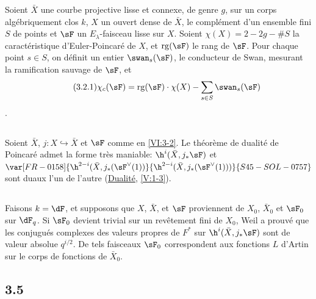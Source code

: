 Soient $\bar X$ une courbe projective lisse et connexe, de genre $g$, sur un 
corps algébriquement clos $k$, $X$ un ouvert dense de $\bar X$, 
le complément d'un ensemble fini $S$ de points et $\sF$ un 
$E_\lambda$-faisceau lisse sur $X$. Soient $\chi(X)=2-2 g-\# S$ la 
caractéristique d'Euler-Poincaré de $X$, et $\operatorname{rg}(\sF)$ le 
rang de $\sF$. Pour chaque point $s\in S$, on définit un entier 
$\swan_s(\sF)$, le conducteur de Swan, mesurant la ramification sauvage de 
$\sF$, et 
\begin{align*}\tag{3.2.1}\label{VI:eq:3-2-1}
  \chi_c(\sF) = \operatorname{rg}(\sF) \cdot \chi(X) - \sum_{s\in S} \swan_s(\sF) 
\end{align*}
. 





\subsection{}\label{VI:3-3}

Soient $\bar X$, $j:X\hookrightarrow\bar X$ et $\sF$ comme en \ref{VI:3-2}. Le 
théorème de dualité de Poincaré admet la forme très maniable: 
$\h^i(\bar X,j_\ast \sF)$ et $\var[FR-0158]{\h^{2-i}(\bar X,j_\ast(\sF^\vee(1))}{\h^{2-i}(\bar X,j_\ast(\sF^\vee(1)))}{S45-SOL-0757}$ sont 
duaux l'un de l'autre (\hyperref[V]{Dualité}, \ref{V:1-3}). 






\subsection{}\label{VI:3-4}

Faisons $k=\dF$, et supposons que $X$, $\bar X$, et $\sF$ proviennent de 
$X_0$, $\bar X_0$ et $\sF_0$ sur $\dF_q$. Si $\sF_0$ devient trivial sur un 
revêtement fini de $X_0$, Weil a prouvé que les conjugués complexes des 
valeurs propres de $F^\ast$ sur $\h^i(\bar X,j_\ast\sF)$ sont de valeur 
absolue $q^{i/2}$. De tels faisceaux $\sF_0$ correspondent aux fonctions $L$ 
d'Artin sur le corps de fonctions de $\bar X_0$. 





\subsection*{3.5}\label{VI:3-5_} %

